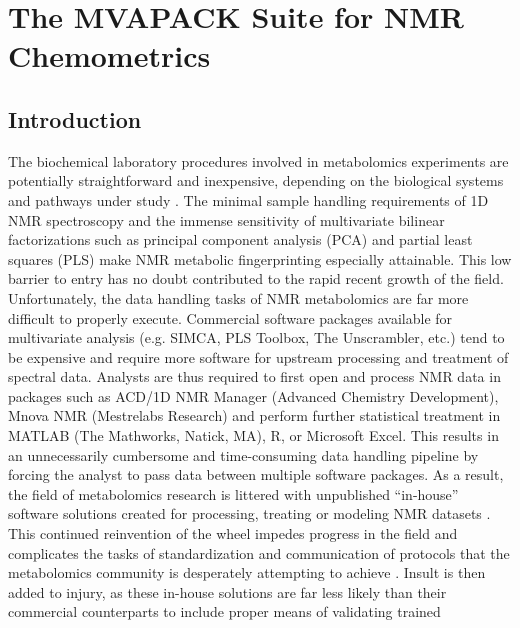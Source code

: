 
\chapter{The MVAPACK Suite for NMR Chemometrics}

\section{Introduction}

\begin{doublespace}
The biochemical laboratory procedures involved in metabolomics experiments
are potentially straightforward and inexpensive, depending on the biological
systems and pathways under study \cite{zhang:jiomic2013}. The minimal sample
handling requirements of 1D \hnmr{} NMR spectroscopy and the immense
sensitivity of multivariate bilinear factorizations such as principal component
analysis (PCA) and partial least squares (PLS) make NMR metabolic
fingerprinting especially attainable. This low barrier to entry has no doubt
contributed to the rapid recent growth of the field. Unfortunately, the data
handling tasks of NMR metabolomics are far more difficult to properly execute.
Commercial software packages available for multivariate analysis (e.g. SIMCA,
PLS Toolbox, The Unscrambler, etc.) tend to be expensive and require more
software for upstream processing and treatment of spectral data. Analysts are
thus required to first open and process NMR data in packages such as ACD/1D NMR
Manager (Advanced Chemistry Development), Mnova NMR (Mestrelabs Research) and
perform further statistical treatment in MATLAB (The Mathworks, Natick, MA), R,
or Microsoft Excel. This results in an unnecessarily cumbersome and
time-consuming data handling pipeline by forcing the analyst to pass data
between multiple software packages. As a result, the field of metabolomics
research is littered with unpublished ``in-house'' software solutions created
for processing, treating or modeling NMR datasets
\cite{viant:bbrc2003,
      verhoeckx:immpc2004,
      cloarec:anchem2005a,
      cloarec:anchem2005b,
      dieterle:anchem2006,
      kang:food2008,
      wiklund:anchem2008}. This continued reinvention of the wheel impedes
progress in the field and complicates the tasks of standardization and
communication of protocols that the metabolomics community is desperately
attempting to achieve \cite{lindon:nbiot2005,goodacre:metab2007}. Insult is
then added to injury, as these in-house solutions are far less likely than
their commercial counterparts to include proper means of validating trained

\end{doublespace}

